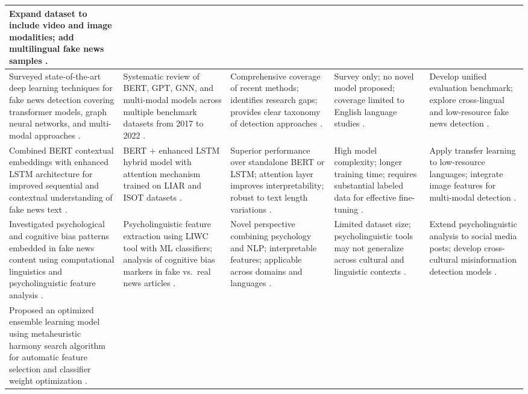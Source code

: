 \begin{longtable}{|p{}|p{}|p{}|p{}|p{}|}
Expand dataset to include video and image modalities; add multilingual fake news samples \cite{Shu2020FakeNewsNet}. \\ \hline
Surveyed state-of-the-art deep learning techniques for fake news detection covering transformer models, graph neural networks, and multi-modal approaches \cite{Mehta2022RecentTrends}. &
Systematic review of BERT, GPT, GNN, and multi-modal models across multiple benchmark datasets from 2017 to 2022 \cite{Mehta2022RecentTrends}. &
Comprehensive coverage of recent methods; identifies research gaps; provides clear taxonomy of detection approaches \cite{Mehta2022RecentTrends}. &
Survey only; no novel model proposed; coverage limited to English language studies \cite{Mehta2022RecentTrends}. &
Develop unified evaluation benchmark; explore cross-lingual and low-resource fake news detection \cite{Mehta2022RecentTrends}. \\ \hline
Combined BERT contextual embeddings with enhanced LSTM architecture for improved sequential and contextual understanding of fake news text \cite{Rai2022FakeNews}. &
BERT + enhanced LSTM hybrid model with attention mechanism trained on LIAR and ISOT datasets \cite{Rai2022FakeNews}. &
Superior performance over standalone BERT or LSTM; attention layer improves interpretability; robust to text length variations \cite{Rai2022FakeNews}. &
High model complexity; longer training time; requires substantial labeled data for effective fine-tuning \cite{Rai2022FakeNews}. &
Apply transfer learning to low-resource languages; integrate image features for multi-modal detection \cite{Rai2022FakeNews}. \\ \hline
Investigated psychological and cognitive bias patterns embedded in fake news content using computational linguistics and psycholinguistic feature analysis \cite{CarrascoFarre2022Fingerprints}. &
Psycholinguistic feature extraction using LIWC tool with ML classifiers; analysis of cognitive bias markers in fake vs.\ real news articles \cite{CarrascoFarre2022Fingerprints}. &
Novel perspective combining psychology and NLP; interpretable features; applicable across domains and languages \cite{CarrascoFarre2022Fingerprints}. &
Limited dataset size; psycholinguistic tools may not generalize across cultural and linguistic contexts \cite{CarrascoFarre2022Fingerprints}. &
Extend psycholinguistic analysis to social media posts; develop cross-cultural misinformation detection models \cite{CarrascoFarre2022Fingerprints}. \\ \hline
Proposed an optimized ensemble learning model using metaheuristic harmony search algorithm for automatic feature selection and classifier weight optimization \cite{Huang2020FakeNews}. &

\end{longtable}
